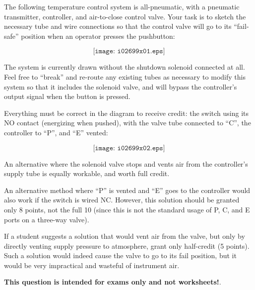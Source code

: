 

The following temperature control system is all-pneumatic, with a pneumatic transmitter, controller, and air-to-close control valve.  Your task is to sketch the necessary tube and wire connections so that the control valve will go to its ``fail-safe'' position when an operator presses the pushbutton:

$$\texttt{[image: i02699x01.eps]}$$

The system is currently drawn without the shutdown solenoid connected at all.  Feel free to ``break'' and re-route any existing tubes as necessary to modify this system so that it includes the solenoid valve, and will bypass the controller's output signal when the button is pressed.
 






Everything must be correct in the diagram to receive credit: the switch using its NO contact (energizing when pushed), with the valve tube connected to ``C'', the controller to ``P'', and ``E'' vented:

$$\texttt{[image: i02699x02.eps]}$$

An alternative where the solenoid valve stops and vents air from the controller's supply tube is equally workable, and worth full credit.

An alternative method where ``P'' is vented and ``E'' goes to the controller would also work if the switch is wired NC.  However, this solution should be granted only 8 points, not the full 10 (since this is not the standard usage of P, C, and E ports on a three-way valve).

If a student suggests a solution that would vent air from the valve, but only by directly venting supply pressure to atmosphere, grant only half-credit (5 points).  Such a solution would indeed cause the valve to go to its fail position, but it would be very impractical and wasteful of instrument air. 







{\bf This question is intended for exams only and not worksheets!}.



